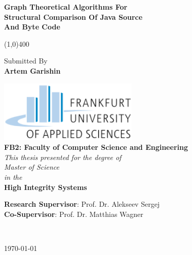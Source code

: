 \documentclass{report}
\newcommand{\Hline}{\par
  \begin{center}
   \line(1,0){400}
   \end{center}
}
\begin{document}


\begin{titlepage}
\begin{center}


{\huge \bfseries Graph Theoretical Algorithms For }\\[0.3cm]
{\huge \bfseries Structural Comparison Of Java Source}\\[0.3cm] %
{\huge \bfseries  And Byte Code }\\[0.3cm]
\Hline

\begin{center}
\large{Submitted By}\\[0.2cm]
\textbf{\Large{Artem Garishin}}\\[2cm]
\end{center}

\includegraphics[width=0.50\textwidth]{Figures/FH_logo}\\[0.5cm]
\textbf{\large FB2: Faculty of Computer Science and Engineering}\\[1cm]


\large \textit{This thesis presented for the degree of\\ Master of Science} \\
\textit{in the}\\[0.2cm]
\textbf{\textcolor{navyblue}{High Integrity Systems}}\\[2.5cm] %

\begin{center}


\begin{varwidth}{0.8\textwidth}
\raggedright
\textbf{Research Supervisor}: {Prof. Dr. Alekseev Sergej}\\[0.2cm] %
\textbf{Co-Supervisor}: {Prof. Dr. Matthias Wagner}\\ %
[3cm]
\end{varwidth}\\[3cm]
\end{center}



{\large \mydate\today}\\[1cm] %

\vfill

\end{center}

\end{titlepage}
\end{document}
